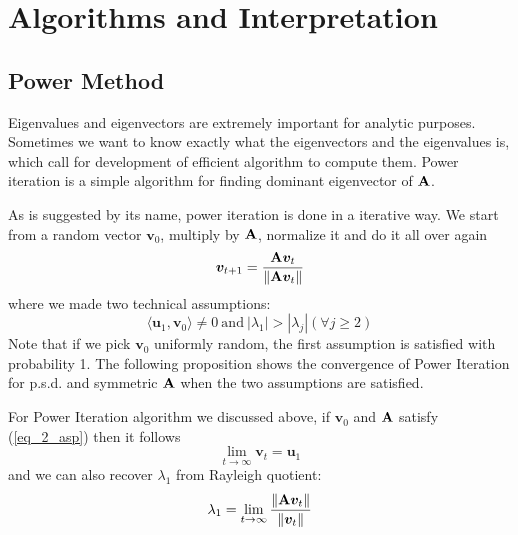 \documentclass[../book-template.tex]{subfiles}
\begin{document}
\section{Algorithms and Interpretation}
\subsection{Power Method}
Eigenvalues and eigenvectors are extremely important for analytic purposes. Sometimes we want to know exactly what the eigenvectors and the eigenvalues is, which call for development of efficient algorithm to compute them. Power iteration is a simple algorithm for finding dominant eigenvector of ${\bf A}$.
\par As is suggested by its name, power iteration is done in a iterative way. We start from a random vector $\bm{v}_0$, multiply by ${\bf A}$, normalize it and do it all over again
\begin{equation*}
    \bm{v}_{t+1} = \frac{{\bf A}\bm{v}_t}{\|{\bf A}\bm{v}_t\|}
\end{equation*}
where we made two technical assumptions:
\begin{equation}\label{eq_2_asp}
    \langle \bm{u}_1,\bm{v}_0\rangle\neq 0\ \text{and}\ |\lambda_1|>|\lambda_j|(\forall j\geq2)
\end{equation}
Note that if we pick $\bm{v}_0$ uniformly random, the first assumption is satisfied with probability 1. The following proposition shows the convergence of Power Iteration for p.s.d. and symmetric ${\bf A}$ when the two assumptions are satisfied.
\begin{proposition}
For Power Iteration algorithm we discussed above, if $\bm{v}_0$ and ${\bf A}$ satisfy (\ref{eq_2_asp}) then it follows
\begin{equation*}
    \lim_{t\rightarrow\infty}\bm{v}_t=\bm{u}_1
\end{equation*}
and we can also recover $\lambda_1$ from Rayleigh quotient:
\begin{equation*}
    \lambda_1 = \lim_{t\rightarrow \infty} \frac{\|{\bf A}\bm{v}_t\|}{\|\bm{v}_t\|}
\end{equation*}
\end{proposition}
\end{document}
